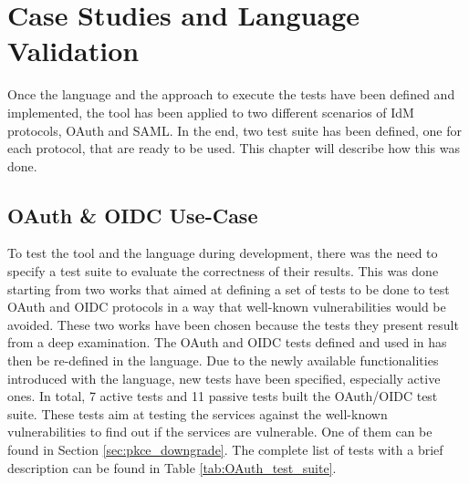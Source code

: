 \chapter{Case Studies and Language Validation}
\label{chap:Use_cases}
Once the language and the approach to execute the tests have been defined and implemented, the tool has been applied to two different scenarios of IdM protocols, OAuth and SAML. In the end, two test suite has been defined, one for each protocol, that are ready to be used. This chapter will describe how this was done.

\section{OAuth \& OIDC Use-Case}    
To test the tool and the language during development, there was the need to specify a test suite to evaluate the correctness of their results. This was done starting from two works \cite{claudio_grisenti,wendy_barreto} that aimed at defining a set of tests to be done to test OAuth and OIDC protocols in a way that well-known vulnerabilities would be avoided. These two works have been chosen because the tests they present result from a deep examination. The \gls{OAuth} and \gls{OIDC} tests defined and used in \cite{claudio_grisenti,wendy_barreto} has then be re-defined in the language. Due to the newly available functionalities introduced with the language, new tests have been specified, especially active ones. In total, 7 active tests and 11 passive tests built the OAuth/OIDC test suite. These tests aim at testing the services against the well-known vulnerabilities to find out if the services are vulnerable. One of them can be found in Section \ref{sec:pkce_downgrade}. The complete list of tests with a brief description can be found in Table \ref{tab:OAuth_test_suite}.

